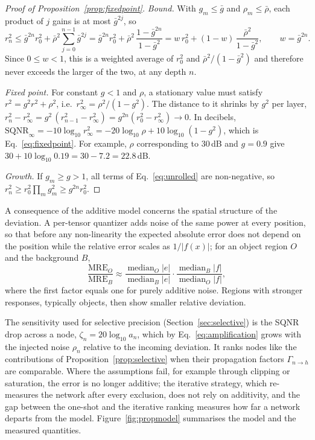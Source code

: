 \documentclass[pdflatex,sn-mathphys-num]{sn-jnl}%
\theoremstyle{thmstyleone}%
\theoremstyle{thmstyletwo}%
\theoremstyle{thmstylethree}%
\begin{document}
\begin{appendices}
\begin{proof}[Proof of Proposition~\ref{prop:fixedpoint}]
\emph{Bound.} With $g_m\le\bar g$ and $\rho_m\le\bar\rho$, each product of $j$ gains is at most $\bar g^{2j}$, so
\begin{equation*}
r_n^2\le\bar g^{2n}r_0^2+\bar\rho^2\sum_{j=0}^{n-1}\bar g^{2j}=\bar g^{2n}r_0^2+\bar\rho^2\,\frac{1-\bar g^{2n}}{1-\bar g^2}=w\,r_0^2+(1-w)\,\frac{\bar\rho^2}{1-\bar g^2},\qquad w=\bar g^{2n}.
\end{equation*}
Since $0\le w<1$, this is a weighted average of $r_0^2$ and $\bar\rho^2/(1-\bar g^2)$ and therefore never exceeds the larger of the two, at any depth $n$.

\emph{Fixed point.} For constant $g<1$ and $\rho$, a stationary value must satisfy $r^2=g^2r^2+\rho^2$, i.e.\ $r_\infty^2=\rho^2/(1-g^2)$. The distance to it shrinks by $g^2$ per layer, $r_n^2-r_\infty^2=g^2\,(r_{n-1}^2-r_\infty^2)=g^{2n}(r_0^2-r_\infty^2)\to0$. In decibels, $\mathrm{SQNR}_\infty=-10\log_{10}r_\infty^2=-20\log_{10}\rho+10\log_{10}(1-g^2)$, which is Eq.~\eqref{eq:fixedpoint}. For example, $\rho$ corresponding to 30\,dB and $g=0.9$ give $30+10\log_{10}0.19=30-7.2=22.8$\,dB.

\emph{Growth.} If $g_m\ge g>1$, all terms of Eq.~\eqref{eq:unrolled} are non-negative, so $r_n^2\ge r_0^2\prod_m g_m^2\ge g^{2n}r_0^2$.
\end{proof}

A consequence of the additive model concerns the spatial structure of the deviation. A per-tensor quantizer adds noise of the same power at every position, so that before any non-linearity the expected absolute error does not depend on the position while the relative error scales as $1/|f(x)|$; for an object region $O$ and the background $B$,
\begin{equation}
\frac{\mathrm{MRE}_O}{\mathrm{MRE}_B}\approx\frac{\operatorname{median}_O|e|}{\operatorname{median}_B|e|}\cdot\frac{\operatorname{median}_B|f|}{\operatorname{median}_O|f|},\label{eq:spatial}
\end{equation}
where the first factor equals one for purely additive noise. Regions with stronger responses, typically objects, then show smaller relative deviation.

The sensitivity used for selective precision (Section~\ref{sec:selective}) is the SQNR drop across a node, $\zeta_n=20\log_{10}a_n$, which by Eq.~\eqref{eq:amplification} grows with the injected noise $\rho_n$ relative to the incoming deviation. It ranks nodes like the contributions of Proposition~\ref{prop:selective} when their propagation factors $\Gamma_{n\to h}$ are comparable. Where the assumptions fail, for example through clipping or saturation, the error is no longer additive; the iterative strategy, which re-measures the network after every exclusion, does not rely on additivity, and the gap between the one-shot and the iterative ranking measures how far a network departs from the model. Figure~\ref{fig:propmodel} summarises the model and the measured quantities.


\end{appendices}
\end{document}
